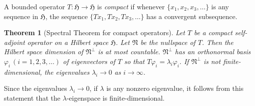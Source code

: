 \documentclass[12pt,reqno]{book}%
\newtheorem{theorem}{Theorem}[chapter]
\theoremstyle{definition}
\theoremstyle{remark}
\theoremstyle{theorem}
\theoremstyle{remark}
\begin{document}
A bounded operator $T : \mathfrak{H} \to \mathfrak{H}$ is \emph{compact} if whenever $\{x_1, x_2, x_3, \ldots\}$ is any sequence in $\mathfrak{H}$, the sequence $\{Tx_1, Tx_2, Tx_3, \ldots \}$ has a convergent subsequence.

\begin{theorem}[Spectral Theorem for compact operators]\label{thm3.1}%
    Let $T$ be a compact self-adjoint operator on a Hilbert space $\mathfrak{H}$.
    Let $\mathfrak{N}$ be the nullspace of $T$.
    Then the Hilbert space dimension of $\mathfrak{N}^\perp$ is at most countable.
    $\mathfrak{N}^\perp$ has an orthonormal basis $\varphi_i \, (i = 1, 2, 3, \ldots )$ of eigenvectors of $T$ so that $T\varphi_i = \lambda_i \varphi_i$.
    If $\mathfrak{N}^\perp$ is not finite-dimensional, the eigenvalues $\lambda_i \to 0$ as $i \to \infty$.
\end{theorem}%

Since the eigenvalues $\lambda_i \to 0$, if $\lambda$ is any nonzero eigenvalue, it follows from this statement that the $\lambda$-eigenspace is finite-dimensional.
\end{document}
